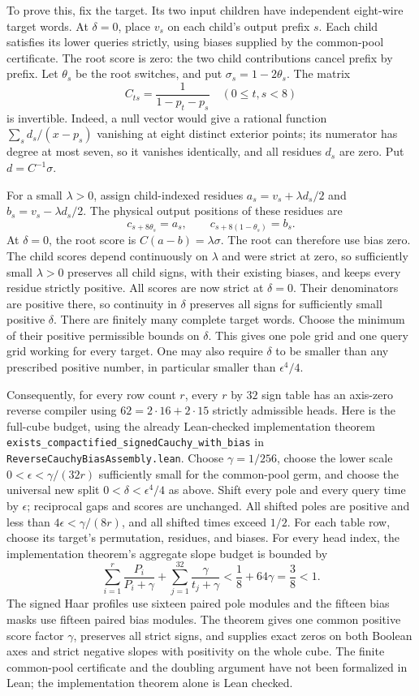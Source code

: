 \documentclass[11pt]{article}
\begin{document}
To prove this, fix the target. Its two input children have independent
eight-wire target words. At $\delta=0$, place $v_s$ on each child's
output prefix $s$. Each child satisfies its lower queries strictly,
using biases supplied by the common-pool certificate. The root score
is zero: the two child contributions cancel prefix by prefix.
Let $\theta_s$ be the root switches, and put $\sigma_s=1-2\theta_s$.
The matrix
\[
 C_{ts}=\frac1{1-p_t-p_s}\quad(0\leq t,s<8)
\]
is invertible. Indeed, a null vector would give a rational function
$\sum_s d_s/(x-p_s)$ vanishing at eight distinct exterior points;
its numerator has degree at most seven, so it vanishes identically,
and all residues $d_s$ are zero. Put $d=C^{-1}\sigma$.

For a small $\lambda>0$, assign child-indexed residues
$a_s=v_s+\lambda d_s/2$ and $b_s=v_s-\lambda d_s/2$.
The physical output positions of these residues are
\[
 c_{s+8\theta_s}=a_s,\qquad c_{s+8(1-\theta_s)}=b_s.
\]
At $\delta=0$, the root score is $C(a-b)=\lambda\sigma$.
The root can therefore use bias zero. The child scores depend
continuously on $\lambda$ and were strict at zero, so sufficiently
small $\lambda>0$ preserves all child signs, with their existing biases, and keeps every
residue strictly positive.
All scores are now strict at $\delta=0$. Their denominators are positive
there, so continuity in $\delta$ preserves all signs for sufficiently
small positive $\delta$. There are finitely many complete target words.
Choose the minimum of their positive permissible bounds on $\delta$.
This gives one pole grid and one query grid working for every target.
One may also require $\delta$ to be smaller than any prescribed positive
number, in particular smaller than $\epsilon^4/4$.

Consequently, for every row count $r$, every $r$ by $32$ sign table has
an axis-zero reverse compiler using $62=2\cdot16+2\cdot15$ strictly
admissible heads. Here is the full-cube budget, using the already
Lean-checked implementation theorem
\texttt{exists\_compactified\_signedCauchy\_with\_bias} in
\texttt{ReverseCauchyBiasAssembly.lean}.
Choose $\gamma=1/256$, choose the lower scale
$0<\epsilon<\gamma/(32r)$ sufficiently small for the common-pool germ,
and choose the universal new split $0<\delta<\epsilon^4/4$ as above.
Shift every pole and every query time by $\epsilon$; reciprocal gaps
and scores are unchanged. All shifted poles are positive and less than
$4\epsilon<\gamma/(8r)$, and all shifted times exceed $1/2$.
For each table row, choose its target's permutation, residues, and
biases. For every head index, the implementation theorem's aggregate
slope budget is bounded by
\[
 \sum_{i=1}^r\frac{P_i}{P_i+\gamma}
 +\sum_{j=1}^{32}\frac{\gamma}{t_j+\gamma}
 <\frac18+64\gamma=\frac38<1.
\]
The signed Haar profiles use sixteen paired pole modules and the fifteen
bias masks use fifteen paired bias modules. The theorem gives one
common positive score factor $\gamma$, preserves all strict signs,
and supplies exact zeros on both Boolean axes and strict negative
slopes with positivity on the whole cube. The finite common-pool
certificate and the doubling argument have not been formalized in Lean;
the implementation theorem alone is Lean checked.
\end{document}
